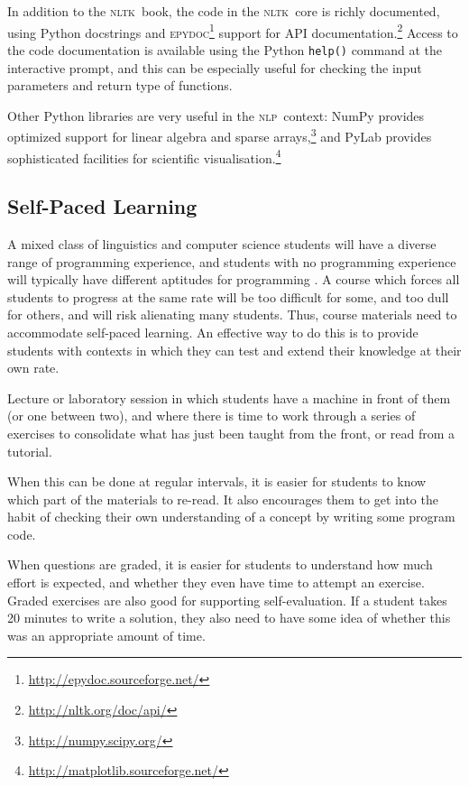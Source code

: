\documentclass[11pt]{article}
\newcommand{\NLP}{\textsc{nlp}}
\newcommand{\NLTK}{\textsc{nltk}}
\newcommand{\code}[1]{\texttt{\small #1}}
\begin{document}
In addition to the \NLTK\ book, the code in the \NLTK\ core is richly
documented, using Python docstrings and
\textsc{epydoc}\footnote{\url{http://epydoc.sourceforge.net/}} support
for API documentation.\footnote{\url{http://nltk.org/doc/api/}} Access
to the code documentation is available using the Python \code{help()}
command at the interactive prompt, and this can be especially useful
for checking the input parameters and return type of functions.

Other Python libraries are very useful in the \NLP\ context: NumPy
provides optimized support for linear algebra and sparse
arrays,\footnote{\url{http://numpy.scipy.org/}} and PyLab provides
sophisticated facilities for scientific
visualisation.\footnote{\url{http://matplotlib.sourceforge.net/}}

\subsection{Self-Paced Learning}

A mixed class of linguistics and computer science students will have a
diverse range of programming experience, and students with no
programming experience will typically have different aptitudes for
programming \cite{Caspersen07}.  A course which forces all students to
progress at the same rate will be too difficult for some, and too dull
for others, and will risk alienating many students.  Thus, course
materials need to accommodate self-paced learning.  An effective way
to do this is to provide students with contexts in which they can test
and extend their knowledge at their own rate.

Lecture or laboratory session in which students have a machine in front of them (or one between two),
and where there is time to work through a series of exercises to consolidate what has just
been taught from the front, or read from a tutorial.

When this can be done at regular intervals, it is easier for students to know which
part of the materials to re-read.  It also encourages them to get into the habit of
checking their own understanding of a concept by writing some program code.

When questions are graded, it is easier for students to understand how much effort is expected,
and whether they even have time to attempt an exercise.  Graded exercises are also good for
supporting self-evaluation.  If a student takes 20 minutes to write a solution, they also need
to have some idea of whether this was an appropriate amount of time.
\end{document}

